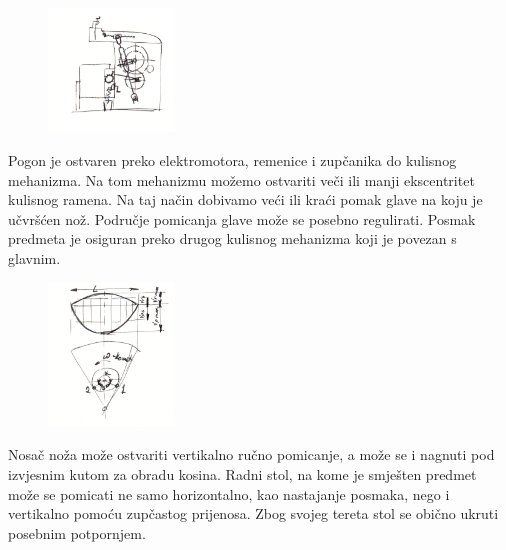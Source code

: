 \documentclass[a4paper,12pt]{article}
\numberwithin{figure}{section}
\begin{document}
\begin{figure}
\vspace{-0.5cm}
  \begin{center}
    \includegraphics[width=0.3\textwidth]{image_15-1.png}
  \end{center}
\end{figure}
\FloatBarrier
Pogon je  ostvaren preko elektromotora, remenice i zupčanika do kulisnog mehanizma. Na tom mehanizmu možemo ostvariti veči ili manji ekscentritet kulisnog ramena. Na taj način dobivamo veći ili kraći pomak glave na koju je učvršćen nož. Područje pomicanja glave može se posebno regulirati. Posmak predmeta je osiguran preko drugog kulisnog mehanizma koji je povezan s glavnim.
\begin{figure}
  \begin{center}
    \includegraphics[width=0.3\textwidth]{image_15-2.png}
  \end{center}
\end{figure}
\FloatBarrier
Nosač noža može ostvariti vertikalno ručno pomicanje, a može se i nagnuti pod izvjesnim kutom za obradu kosina. Radni stol, na kome je smješten predmet može se pomicati ne samo horizontalno, kao nastajanje posmaka, nego i vertikalno pomoću zupčastog prijenosa. Zbog svojeg tereta stol se obično ukruti posebnim potpornjem. 
\end{document}
